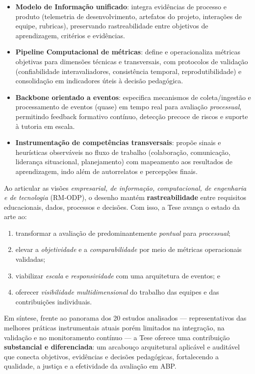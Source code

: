 \documentclass[12pt,a4paper]{article}
\begin{document}
\begin{itemize}
  \item \textbf{Modelo de Informação unificado}: integra evidências de processo e produto (telemetria de desenvolvimento, artefatos do projeto, interações de equipe, rubricas), preservando rastreabilidade entre objetivos de aprendizagem, critérios e evidências.
  \item \textbf{Pipeline Computacional de métricas}: define e operacionaliza métricas objetivas para dimensões técnicas e transversais, com protocolos de validação (confiabilidade interavaliadores, consistência temporal, reprodutibilidade) e consolidação em indicadores úteis à decisão pedagógica.
  \item \textbf{Backbone orientado a eventos}: especifica mecanismos de coleta/ingestão e processamento de eventos (quase) em tempo real para avaliação \emph{processual}, permitindo feedback formativo contínuo, detecção precoce de riscos e suporte à tutoria em escala.
  \item \textbf{Instrumentação de competências transversais}: propõe sinais e heurísticas observáveis no fluxo de trabalho (colaboração, comunicação, liderança situacional, planejamento) com mapeamento aos resultados de aprendizagem, indo além de autorrelatos e percepções finais.
\end{itemize}

Ao articular as visões \emph{empresarial, de informação, computacional, de engenharia e de tecnologia} (RM‑ODP), o desenho mantém \textbf{rastreabilidade} entre requisitos educacionais, dados, processos e decisões. Com isso, a Tese avança o estado da arte ao:
\begin{enumerate}
  \item transformar a avaliação de predominantemente \emph{pontual} para \emph{processual};
  \item elevar a \emph{objetividade} e a \emph{comparabilidade} por meio de métricas operacionais validadas;
  \item viabilizar \emph{escala} e \emph{responsividade} com uma arquitetura de eventos; e
  \item oferecer \emph{visibilidade multidimensional} do trabalho das equipes e das contribuições individuais.
\end{enumerate}

Em síntese, frente ao panorama dos 20 estudos analisados — representativos das melhores práticas instrumentais atuais porém limitados na integração, na validação e no monitoramento contínuo — a Tese oferece uma contribuição \textbf{substancial e diferenciada}: um arcabouço arquitetural aplicável e auditável que conecta objetivos, evidências e decisões pedagógicas, fortalecendo a qualidade, a justiça e a efetividade da avaliação em ABP.
\end{document}
